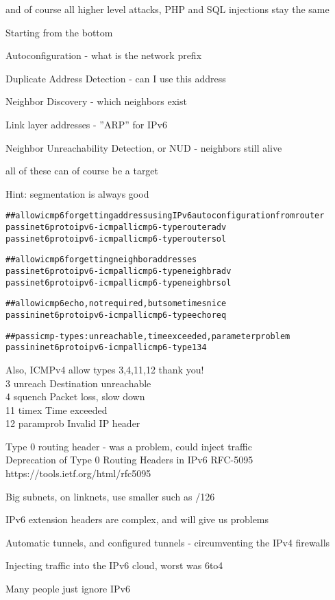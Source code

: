 \documentclass[18pt,landscape,a4paper,footrule]{foils}
\begin{document}
\vskip 1cm
\centerline{and of course all higher level attacks, PHP and SQL injections stay the same}


Starting from the bottom
\begin{list2}
\item Autoconfiguration - what is the network prefix
\item Duplicate Address Detection - can I use this address
\item Neighbor Discovery - which neighbors exist
\item Link layer addresses - ”ARP” for IPv6
\item Neighbor Unreachability Detection, or NUD - neighbors still alive
\end{list2}

\vskip 1cm
\centerline{all of these can of course be a target}

Hint: segmentation is always good


\begin{alltt}\footnotesize
## allow icmp6 for getting address using IPv6 autoconfiguration from router
pass inet6 proto ipv6-icmp all icmp6-type routeradv
pass inet6 proto ipv6-icmp all icmp6-type routersol

## allow icmp6 for getting neighbor addresses
pass inet6 proto ipv6-icmp all icmp6-type neighbradv
pass inet6 proto ipv6-icmp all icmp6-type neighbrsol

## allow icmp6 echo, not required, but sometimes nice
pass in inet6 proto ipv6-icmp all icmp6-type echoreq

## pass icmp-types: unreachable, time exceeded, parameter problem
pass in inet6 proto ipv6-icmp all icmp6-type {1 3 4}
\end{alltt}

{\small
Also, ICMPv4 allow types 3,4,11,12 thank you!\\
3      unreach       Destination unreachable \\
4      squench       Packet loss, slow down\\
11     timex         Time exceeded \\
12     paramprob     Invalid IP header\\
}

\begin{list2}
\item Type 0 routing header - was a problem, could inject traffic\\
Deprecation of Type 0 Routing Headers in IPv6 RFC-5095\\
https://tools.ietf.org/html/rfc5095
\item Big subnets, on linknets, use smaller such as /126
\item IPv6 extension headers are complex, and will give us problems
\item Automatic tunnels, and configured tunnels - circumventing the IPv4 firewalls
\item Injecting traffic into the IPv6 cloud, worst was 6to4
\item Many people just ignore IPv6
\end{list2}
\end{document}
